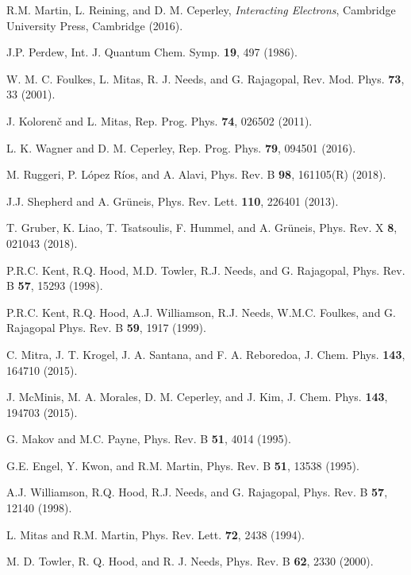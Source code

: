 \begin{thebibliography}{99}

 R.M. Martin, L. Reining, and D. M. Ceperley, {\em Interacting Electrons}, Cambridge  University Press, Cambridge (2016).

 J.P. Perdew, Int. J. Quantum Chem. Symp. {\bf 19}, 497 (1986).

 W. M. C. Foulkes, L. Mitas, R. J. Needs, and G. Rajagopal,
Rev. Mod. Phys. {\bf 73}, 33 (2001).

 J. Koloren{\v{c}} and L. Mitas, Rep. Prog. Phys. {\bf 74}, 026502 (2011).

 L. K. Wagner and D. M. Ceperley, Rep. Prog. Phys. {\bf 79}, 094501 (2016).

 M. Ruggeri, P. L{\'o}pez R{\'i}os, and A. Alavi,
Phys. Rev. B {\bf 98}, 161105(R) (2018).

 J.J. Shepherd and A. Gr{\"u}neis,
Phys. Rev. Lett. {\bf 110}, 226401 (2013).

 T. Gruber, K. Liao, T. Tsatsoulis, F. Hummel, and A. Gr{\"u}neis,
Phys. Rev. X {\bf 8}, 021043 (2018).

 P.R.C. Kent, R.Q. Hood, M.D. Towler, R.J. Needs, and G. Rajagopal, 
Phys. Rev. B {\bf 57}, 15293 (1998).

 P.R.C. Kent, R.Q. Hood, A.J. Williamson, R.J. Needs, W.M.C. Foulkes, and G. Rajagopal
Phys. Rev. B {\bf 59}, 1917 (1999).

  C. Mitra, J. T. Krogel, J. A. Santana, and F. A. Reboredoa, J. Chem. Phys. {\bf 143}, 164710 (2015).

 J. McMinis, M. A. Morales, D. M. Ceperley, and J. Kim, J. Chem. Phys. {\bf 143}, 194703 (2015).

 G. Makov and M.C. Payne, Phys. Rev. B {\bf 51}, 4014 (1995).

 G.E. Engel, Y. Kwon, and R.M. Martin, Phys. Rev. B {\bf 51}, 13538 (1995).

 A.J. Williamson, R.Q. Hood, R.J. Needs, and G. Rajagopal,
Phys. Rev. B {\bf 57}, 12140 (1998).

 L. Mitas and R.M. Martin, Phys. Rev. Lett. {\bf 72}, 2438 (1994).

 M. D. Towler, R. Q. Hood, and R. J. Needs, Phys. Rev. B {\bf 62}, 2330 (2000).


\end{thebibliography}
